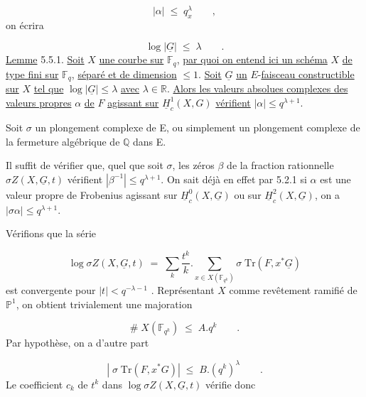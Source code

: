 \begin{equation*}
|\alpha| \;\leqslant\; q_x^{\lambda} \qquad ,
\end{equation*}
on écrira

\begin{equation*}
\log |\underline{G}| \;\leqslant\; \lambda \qquad .
\end{equation*}
\underline{Lemme} 5.5.1. \underline{Soit} $X$ \underline{une courbe sur} $\mathbb{F}_q$, \underline{par quoi on entend ici un schéma} $X$ \underline{de type fini sur} $\mathbb{F}_q$, \underline{séparé et de dimension} $\leqslant 1$. \underline{Soit} $\underline{G}$ \underline{un} $E$-\underline{faisceau constructible sur} $X$ \underline{tel que} $\log |\underline{G}| \leqslant \lambda$ \underline{avec} $\lambda \in \mathbb{R}$. \underline{Alors les valeurs absolues complexes des valeurs propres} $\alpha$ \underline{de} $F$ \underline{agissant sur} $\underline{H}^1_c(X,G)$ \underline{vérifient} $|\alpha| \leqslant q^{\lambda+1}$.

Soit $\sigma$ un plongement complexe de E, ou simplement un plongement complexe de la fermeture algébrique de $\mathbb{Q}$ dans E.

Il suffit de vérifier que, quel que soit $\sigma$, les zéros $\beta$ de la fraction rationnelle $\sigma Z(X,\underline{G},t)$ vérifient $|\beta^{-1}| \leqslant q^{\lambda+1}$. On sait déjà en
effet par 5.2.1 si $\alpha$ est une valeur propre de Frobenius agissant sur $\underline{H}^0_c(X,\underline{G})$ ou sur $\underline{H}^2_c(X,\underline{G})$, on a $|\sigma \alpha| \leqslant q^{\lambda+1}$.

Vérifions que la série

\begin{equation*}
\log \sigma Z(X,\underline{G},t) \;=\; \sum_k \frac{t^k}{k} . \sum_{x \in X(\mathbb{F}_{q^k})} \sigma \; \mathrm{Tr}(F,x^*\underline{G})
\end{equation*}
est convergente pour $|t| < q^{-\lambda-1}$ . Représentant $X$ comme revêtement ramifié de $\mathbb{P}^1$, on obtient trivialement une majoration

\begin{equation*}
\# \; X(\mathbb{F}_{q^k}) \;\leqslant\; A.q^k \qquad .
\end{equation*}
Par hypothèse, on a d'autre part

\begin{equation*}
\left| \; \sigma \; \mathrm{Tr}(F,x^*G) \right| \;\leqslant\; B.(q^k)^{\lambda} \qquad .
\end{equation*}
Le coefficient $c_k$ de $t^k$ dans $\log \sigma Z (X,\underline{G},t)$ vérifie donc

